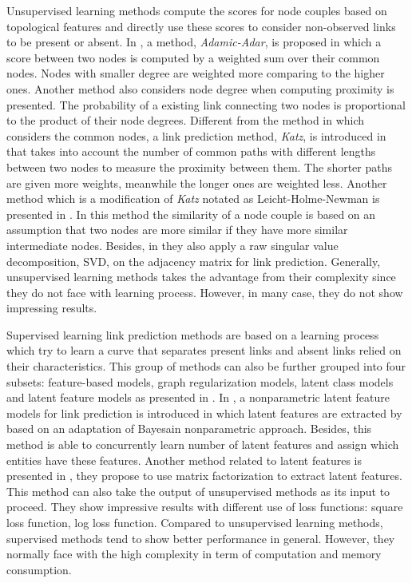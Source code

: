 \documentclass[runningheads,a4paper]{llncs}
\begin{document}
Unsupervised learning methods compute the scores for node couples based on topological features and directly use these scores to consider non-observed links to be present or absent. In \cite{adamic}, a method, \textit{Adamic-Adar}, is proposed in which a score between two nodes is computed by a weighted sum over their common nodes. Nodes with smaller degree are weighted more comparing to the higher ones. Another method also considers node degree when computing proximity is presented. The probability of a existing link connecting two nodes is proportional to the product of their node degrees. Different from the method in \cite{adamic} which considers the common nodes, a link prediction method, \textit{Katz}, is introduced in \cite{katz} that takes into account the number of common paths with different lengths between two nodes to measure the proximity between them. The shorter paths are given more weights, meanwhile the longer ones are weighted less. Another method which is a modification of \textit{Katz} notated as Leicht-Holme-Newman is presented in \cite{lhni}. In this method the similarity of a node couple is based on an assumption that two nodes are more similar if they have more similar intermediate nodes. Besides, in \cite{matrix-factorization} they also apply a raw singular value decomposition, SVD, on the adjacency matrix for link prediction. Generally, unsupervised learning methods takes the advantage from their complexity since they do not face with learning process. However, in many case, they do not show impressing results.

Supervised learning link prediction methods are based on a learning process which try to learn a curve that separates present links and absent links relied on their characteristics. This group of methods can also be further grouped into four subsets: feature-based models, graph regularization models, latent class models and latent feature models as presented in \cite{matrix-factorization}. In \cite{nonparametric}, a nonparametric latent feature models for link prediction is introduced in which latent features are extracted by based on an adaptation of Bayesain nonparametric approach. Besides, this method is able to concurrently learn number of latent features and assign which entities have these features. Another method related to latent features is presented in \cite{matrix-factorization}, they propose to use matrix factorization to extract latent features. This method can also take the output of unsupervised methods as its input to proceed. They show impressive results with different use of loss functions: square loss function, log loss function. Compared to unsupervised learning methods, supervised methods tend to show better performance in general. However, they normally face with the high complexity in term of computation and memory consumption.
\end{document}
